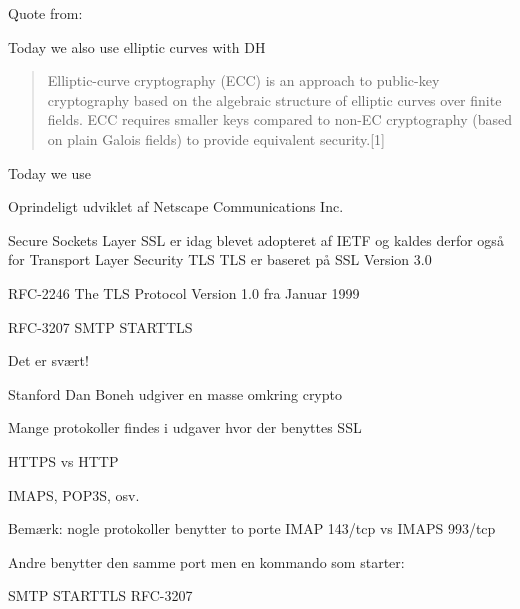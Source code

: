 \documentclass[Screen16to9,17pt]{foils}
\begin{document}
\begin{list2}
\item Quote from: {\small {}}
\item Today we also use elliptic curves with DH \\{\small {}}
\end{list2}


\begin{quote}
Elliptic-curve cryptography (ECC) is an approach to public-key cryptography based on the algebraic structure of elliptic curves over finite fields. ECC requires smaller keys compared to non-EC cryptography (based on plain Galois fields) to provide equivalent security.[1]
\end{quote}

\begin{list2}
\item Today we use 
\end{list2}





\begin{list1}
\item Oprindeligt udviklet af Netscape Communications Inc.
\item Secure Sockets Layer SSL er idag blevet adopteret af IETF og kaldes
derfor også for Transport Layer Security TLS
TLS er baseret på SSL Version 3.0
\item RFC-2246 The TLS Protocol Version 1.0 fra Januar 1999
\item RFC-3207 SMTP STARTTLS
\item Det er svært!
\item Stanford Dan Boneh udgiver en masse omkring crypto\\ 
\end{list1}



\begin{list1}
\item Mange protokoller findes i udgaver hvor der benyttes SSL
\item HTTPS vs HTTP
\item IMAPS, POP3S, osv.
\item Bemærk: nogle protokoller benytter to porte IMAP 143/tcp vs IMAPS 993/tcp
\item Andre benytter den samme port men en kommando som starter:
\item SMTP STARTTLS RFC-3207
\end{list1}
\end{document}
